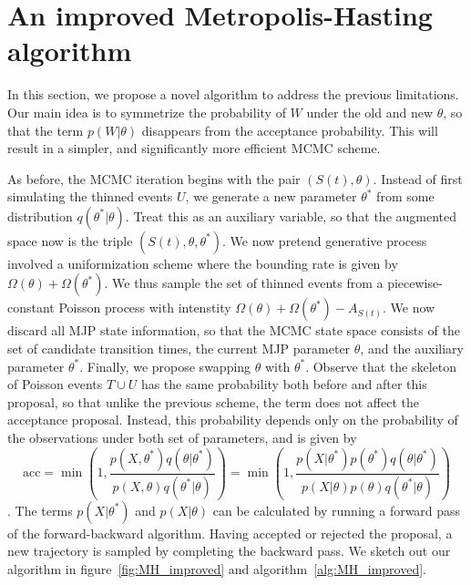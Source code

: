 
\section{An improved Metropolis-Hasting algorithm}

In this section, we propose a novel algorithm to address the previous limitations.
Our main idea is to symmetrize the probability of $W$ under the old and new 
$\theta$, so that the term
$p(W|\theta)$ disappears from the acceptance probability. This will result
in a simpler, and significantly more efficient MCMC scheme.

As before, the MCMC iteration begins with the pair $(S(t), \theta)$. 
Instead of first simulating the thinned events $U$, we generate a new parameter 
$\theta^*$ from some distribution $q(\theta^*|\theta)$. Treat this as an 
auxiliary variable, so that the augmented space now is the triple 
$(S(t), \theta,\theta^*)$. We now pretend generative process involved a 
uniformization scheme
where the bounding rate is given by $\Omega(\theta) + \Omega(\theta^*)$.
We thus sample the set of thinned events from a piecewise-constant
Poisson process with intenstity $\Omega(\theta) + \Omega(\theta^*) - 
A_{S(t)}$. We now discard all MJP state information, so that the MCMC
state space consists of the set of candidate transition times, the current
MJP parameter $\theta$, and the auxiliary parameter $\theta^*$.
Finally, we propose swapping $\theta$ with $\theta^*$. Observe that the
skeleton of Poisson events $T \cup U$ has the same probability both
before and after this proposal, so that unlike the previous scheme,
the term does not affect the acceptance proposal. Instead, this
probability depends only on the probability of the observations
under both set of parameters, %
and is given by
$$ \text{acc} = 
  \min\left(1, \frac{p(X,\theta^*)q(\theta|\theta^*)}
   {p(X,\theta)q(\theta^*|\theta)}\right) = 
  \min\left(1, \frac{p(X|\theta^*)p(\theta^*)q(\theta|\theta^*)}
   {p(X|\theta)p(\theta)q(\theta^*|\theta)}\right)
   $$.
   The terms $p(X|\theta^*)$ and  $p(X|\theta)$ can be calculated by 
   running a forward pass of the forward-backward algorithm. Having
   accepted or rejected the proposal, a new trajectory is sampled by
   completing the backward pass. We sketch out our algorithm in 
   figure~\ref{fig:MH_improved} and algorithm~\ref{alg:MH_improved}.
\setlength{\unitlength}{0.8cm}
